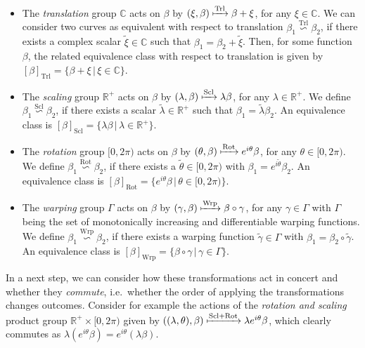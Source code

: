 \begin{itemize}[leftmargin=0.75cm]
  \item[1.] The \emph{translation} group $\mathbb{C}$ acts on $\beta$ by $(\xi, \beta) \xmapsto{\text{Trl}} \beta + \xi$, for any $\xi \in \mathbb{C}$.
    We can consider two curves as equivalent with respect to translation $\beta_1 \overset{\text{Trl}}{\backsim} \beta_2$, if there exists a complex scalar $\widetilde\xi \in \mathbb{C}$ such that $\beta_1 = \beta_2  + \widetilde\xi$.
    Then, for some function $\beta$, the related equivalence class with respect to translation is given by $[\beta]_{\text{Trl}} = \{\beta + \xi\, |\, \xi \in \mathbb{C}\}$.
  \item[2.] The \emph{scaling} group $\mathbb{R}^+$ acts on $\beta$ by $(\lambda, \beta) \xmapsto{\text{Scl}} \lambda \beta$, for any $\lambda \in \mathbb{R}^+$.
    We define $\beta_1 \overset{\text{Scl}}{\backsim} \beta_2$, if there exists a scalar $\widetilde\lambda \in \mathbb{R}^+$ such that $\beta_1 = \widetilde\lambda \beta_2$.
    An equivalence class is $[\beta]_{\text{Scl}} = \{\lambda\beta\,|\, \lambda \in \mathbb{R}^+\}$.
  \item[3.] The \emph{rotation} group $[0,2\pi)$ acts on $\beta$ by $(\theta, \beta) \xmapsto{\text{Rot}}  e^{i\theta} \beta$, for any $\theta \in [0,2\pi)$.
    We define $\beta_1 \overset{\text{Rot}}{\backsim} \beta_2$, if there exists a $\widetilde\theta \in [0,2\pi)$ with $\beta_1 = e^{i\widetilde\theta} \beta_2$.
    An equivalence class is $[\beta]_{\text{Rot}} = \{e^{i\theta}\beta\,|\, \theta \in [0,2\pi)\}$.
  \item[4.] The \emph{warping} group $\Gamma$ acts on $\beta$ by $(\gamma,\beta) \xmapsto{\text{Wrp}} \beta \circ \gamma$, for any $\gamma \in \Gamma$ with $\Gamma$ being the set of monotonically increasing and differentiable warping functions.
    We define $\beta_1 \overset{\text{Wrp}}{\backsim} \beta_2$, if there exists a warping function $\widetilde\gamma \in \Gamma$ with $\beta_1 = \beta_2 \circ \widetilde\gamma$.
    An equivalence class is $[\beta]_{\text{Wrp}} = \{\beta \circ \gamma\,|\, \gamma \in \Gamma\}$.
\end{itemize}
In a next step, we can consider how these transformations act in concert and whether they \textit{commute}, i.e.\ whether the order of applying the transformations changes outcomes.
Consider for example the actions of the \emph{rotation and scaling} product group $\mathbb{R}^+ \times [0,2\pi)$ given by $\left((\lambda, \theta), \beta\right) \xmapsto{\text{Scl} + \text{Rot}} \lambda e^{i\theta} \beta$, which clearly commutes as $\lambda(e^{i\theta}\beta) = e^{i\theta}(\lambda\beta)$.
